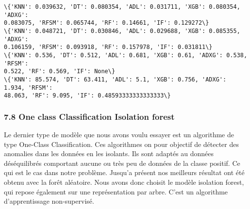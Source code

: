 \documentclass[11pt]{article}
\begin{document}
    \begin{Verbatim}[commandchars=\\\{\}]
\{'KNN': 0.039632, 'DT': 0.080354, 'ADL': 0.031711, 'XGB': 0.080354, 'ADXG':
0.083075, 'RFSM': 0.065744, 'RF': 0.14661, 'IF': 0.129272\}
\{'KNN': 0.048721, 'DT': 0.030846, 'ADL': 0.029688, 'XGB': 0.085355, 'ADXG':
0.106159, 'RFSM': 0.093918, 'RF': 0.157978, 'IF': 0.031811\}
\{'KNN': 0.536, 'DT': 0.512, 'ADL': 0.681, 'XGB': 0.61, 'ADXG': 0.538, 'RFSM':
0.522, 'RF': 0.569, 'IF': None\}
\{'KNN': 85.574, 'DT': 63.411, 'ADL': 5.1, 'XGB': 0.756, 'ADXG': 1.934, 'RFSM':
48.063, 'RF': 9.095, 'IF': 0.48593333333333333\}
    \end{Verbatim}

    \hypertarget{one-class-classification-isolation-forest}{%
\subsubsection{7.8 One class Classification Isolation
forest}\label{one-class-classification-isolation-forest}}

Le dernier type de modèle que nous avons voulu essayer est un algorithme
de type One-Class Classification. Ces algorithmes on pour objectif de
détecter des anomalies dans les données en les isolants. Ils sont
adaptés au données déséquilibrés comportant aucune ou très peu de
données de la classe positif. Ce qui est le cas dans notre problème.
Jusqu'a présent nos meilleurs résultat ont été obtenu avec la forêt
aléatoire. Nous avons donc choisit le modèle isolation forest, qui
repose également sur une représentation par arbre. C'est un algorithme
d'apprentissage non-supervisé.
\end{document}
